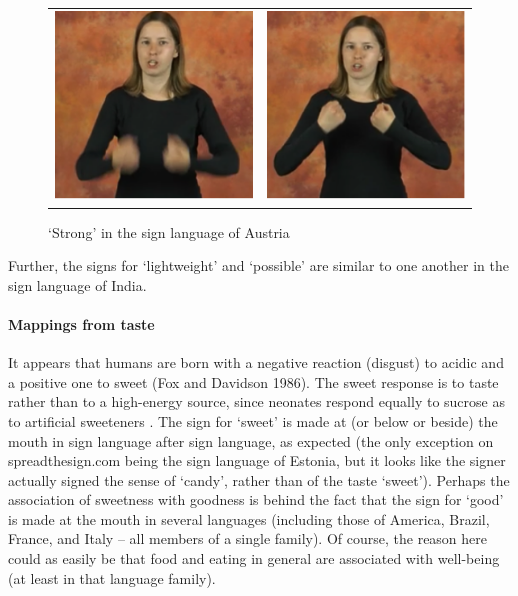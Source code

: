 \documentclass[output=paper,
modfonts
]{LSP/langsci}
\begin{document}
\begin{figure}
	\begin{tabularx}{\textwidth}{CC}
		\includegraphics{napoli_fig7a} & \includegraphics{napoli_fig7b}
	\end{tabularx}
	\caption{`Strong' in the sign language of Austria}
	\label{fig:7}
\end{figure}


Further, the signs for `lightweight' and `possible' are similar to one
another in the sign language of India.

\paragraph{Mappings from taste} It appears that humans are born with a
negative reaction (disgust) to acidic and a positive one to sweet (Fox
and Davidson 1986). The sweet response is to taste rather than to a
high-energy source, since neonates respond equally to sucrose as to
artificial sweeteners \citep{ramenghi1996}. The sign for `sweet' is
made at (or below or beside) the mouth in sign language after sign
language, as expected (the only exception on spreadthesign.com being the
sign language of Estonia, but it looks like the signer actually signed
the sense of `candy', rather than of the taste `sweet'). Perhaps the
association of sweetness with goodness is behind the fact that the sign
for `good' is made at the mouth in several languages (including those of
America, Brazil, France, and Italy -- all members of a single family).
Of course, the reason here could as easily be that food and eating in
general are associated with well-being (at least in that language
family).
\end{document}
